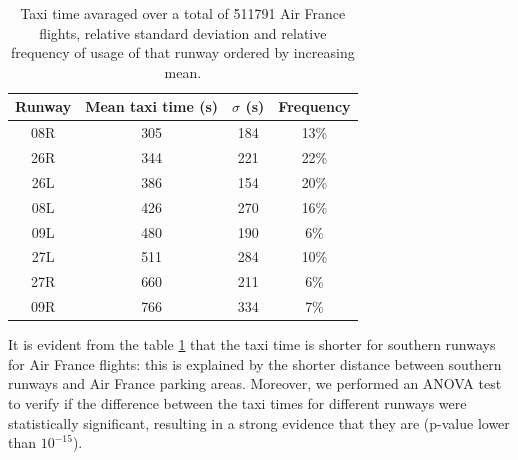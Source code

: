 \documentclass{article}
\begin{document}
\begin{table}[h!!!!!!!!!!!!!!!!!]	
	\centering
	\begin{tabular}{c|c|c|c}
		\centering
		\textbf{Runway} & \textbf{Mean taxi time (s)} & \textbf{$\sigma$ (s)} & Frequency\\
		\hline
		08R & 305 & 184 & 13\%\\
		\hline
		26R & 344 & 221 & 22\%\\
		\hline
		26L & 386 & 154 & 20\%\\
		\hline
		08L & 426 & 270 & 16\%\\
		\hline
		09L & 480 & 190 & 6\%\\
		\hline
		27L & 511 & 284 & 10\%\\
		\hline
		27R & 660 & 211 & 6\%\\
		\hline
		09R & 766 & 334 & 7\%\\	
	\end{tabular}
\caption{Taxi time avaraged over a total of 511791 Air France flights, relative standard deviation and relative frequency of usage of that runway ordered by increasing mean.}
\label{tableRunway}
\end{table}
It is evident from the table \ref{tableRunway} that the taxi time is shorter for southern runways for Air France flights: this is explained by the shorter distance between southern runways and Air France parking areas.
Moreover, we performed an ANOVA test to verify if the difference between the taxi times for different runways were statistically significant, resulting in a strong evidence that they are (p-value lower than $10^{-15}$).
\end{document}
